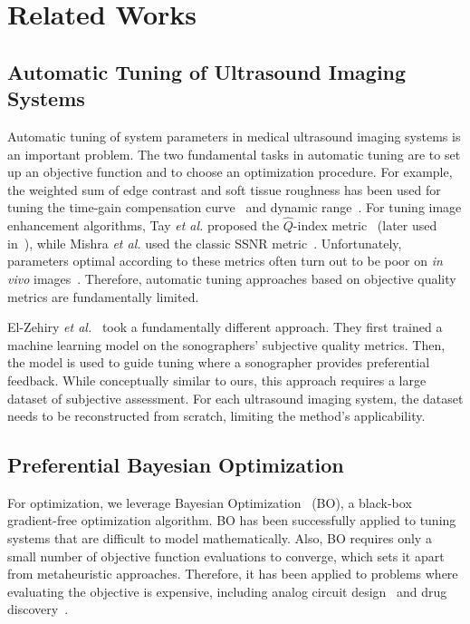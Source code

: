 
\section{Related Works}\label{section:relatedworks}
\subsection{Automatic Tuning of Ultrasound Imaging Systems}
Automatic tuning of system parameters in medical ultrasound imaging systems is an important problem.
The two fundamental tasks in automatic tuning are to set up an objective function and to choose an optimization procedure.
For example, the weighted sum of edge contrast and soft tissue roughness has been used for tuning the time-gain compensation curve~\cite{lee_automatic_2006} and dynamic range~\cite{lee_automatic_2015}.
For tuning image enhancement algorithms, Tay \textit{et al.} proposed the \(\widehat{Q}\)-index metric~\cite{tay_ultrasound_2006} (later used in~\cite{coupe_nonlocal_2009, ramos-llorden_anisotropic_2015}), while Mishra \textit{et al.} used the classic SSNR metric~\cite{mishra_edge_2018}.
Unfortunately, parameters optimal according to these metrics often turn out to be poor on \textit{in vivo} images~\cite{ramos-llorden_anisotropic_2015}.
Therefore, automatic tuning approaches based on objective quality metrics are fundamentally limited.

El-Zehiry \textit{et al.}~\cite{el-zehiry_learning_2013} took a fundamentally different approach.
They first trained a machine learning model on the sonographers' subjective quality metrics.
Then, the model is used to guide tuning where a sonographer provides preferential feedback.
While conceptually similar to ours, this approach requires a large dataset of subjective assessment.
For each ultrasound imaging system, the dataset needs to be reconstructed from scratch, limiting the method's applicability.

\subsection{Preferential Bayesian Optimization}
For optimization, we leverage Bayesian Optimization~\cite{shahriari_taking_2016} (BO), a black-box gradient-free optimization algorithm.
BO has been successfully applied to tuning systems that are difficult to model mathematically.
Also, BO requires only a small number of objective function evaluations to converge, which sets it apart from metaheuristic approaches.
Therefore, it has been applied to problems where evaluating the objective is expensive, including analog circuit design~\cite{lyu_multiobjective_2018} and drug discovery~\cite{sano_application_2020}.

